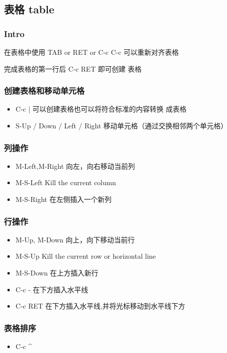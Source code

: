 \documentclass[11pt]{article}
\begin{document}
\subsection{表格 table}
\label{sec:orgb37c286}
\subsubsection{Intro}
\label{sec:org6eb8c90}
在表格中使用 TAB or RET or C-c C-c
可以重新对齐表格

完成表格的第一行后 C-c RET 即可创建
表格
\subsubsection{创建表格和移动单元格}
\label{sec:org48441eb}
\begin{itemize}
\item C-c |
可以创建表格也可以将符合标准的内容转换
成表格
\item S-Up / Down / Left / Right
移动单元格（通过交换相邻两个单元格）
\end{itemize}
\subsubsection{列操作}
\label{sec:org9939f59}
\begin{itemize}
\item M-Left,M-Right
向左，向右移动当前列
\item M-S-Left
Kill the current column
\item M-S-Right
在左侧插入一个新列
\end{itemize}
\subsubsection{行操作}
\label{sec:orgd213c3b}
\begin{itemize}
\item M-Up, M-Down
向上，向下移动当前行
\item M-S-Up
Kill the current row or horizontal line
\item M-S-Down
在上方插入新行
\item C-c -
在下方插入水平线
\item C-c RET
在下方插入水平线,并将光标移动到水平线下方
\end{itemize}
\subsubsection{表格排序}
\label{sec:orgf341ef2}
\begin{itemize}
\item C-c \^{}
\end{itemize}
\end{document}
